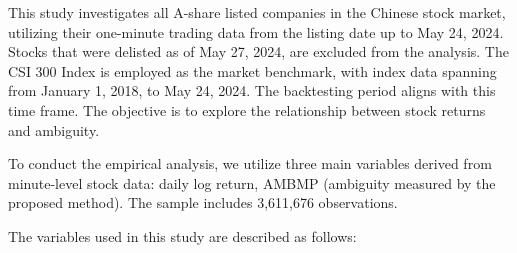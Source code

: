 \documentclass[preprint,12pt,authoryear]{elsarticle}
\begin{document}
This study investigates all A-share listed companies in the Chinese stock market, utilizing their one-minute trading data from the listing date up to May 24, 2024. Stocks that were delisted as of May 27, 2024, are excluded from the analysis. The CSI 300 Index is employed as the market benchmark, with index data spanning from January 1, 2018, to May 24, 2024. The backtesting period aligns with this time frame. The objective is to explore the relationship between stock returns and ambiguity.

To conduct the empirical analysis, we utilize three main variables derived from minute-level stock data: daily log return, AMBMP (ambiguity measured by the proposed method). The sample includes 3,611,676 observations.

The variables used in this study are described as follows:
\end{document}
